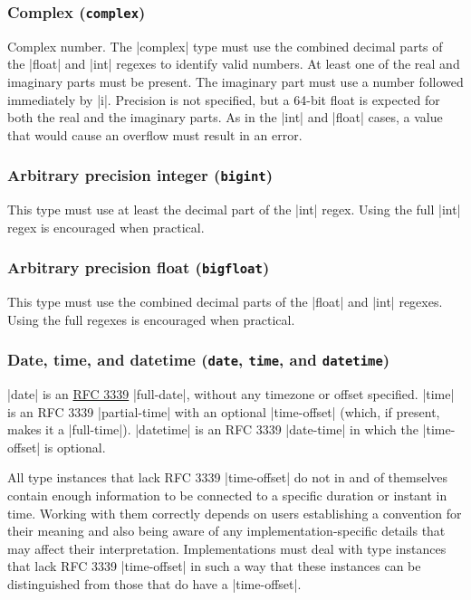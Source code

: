 \documentclass[11pt]{article}
\begin{document}
\subsubsection{Complex (\texttt{complex})}

Complex number.  The |complex| type must use the combined decimal parts of the |float| and |int| regexes to identify valid numbers.  At least one of the real and imaginary parts must be present.  The imaginary part must use a number followed immediately by |i|.  Precision is not specified, but a 64-bit float is expected for both the real and the imaginary parts.  As in the |int| and |float| cases, a value that would cause an overflow must result in an error.


\subsubsection{Arbitrary precision integer (\texttt{bigint})}

This type must use at least the decimal part of the |int| regex.  Using the full |int| regex is encouraged when practical.


\subsubsection{Arbitrary precision float (\texttt{bigfloat})}

This type must use the combined decimal parts of the |float| and |int| regexes.  Using the full regexes is encouraged when practical.


\subsubsection{Date, time, and datetime (\texttt{date}, \texttt{time}, and \texttt{datetime})}

|date| is an \href{http://tools.ietf.org/html/rfc3339}{RFC 3339} |full-date|, without any timezone or offset specified.  |time| is an RFC 3339 |partial-time| with an optional |time-offset| (which, if present, makes it a |full-time|).  |datetime| is an RFC 3339 |date-time| in which the |time-offset| is optional.

All type instances that lack RFC 3339 |time-offset| do not in and of themselves contain enough information to be connected to a specific duration or instant in time.  Working with them correctly depends on users establishing a convention for their meaning and also being aware of any implementation-specific details that may affect their interpretation.  Implementations must deal with type instances that lack RFC 3339 |time-offset| in such a way that these instances can be distinguished from those that do have a |time-offset|.
\end{document}
